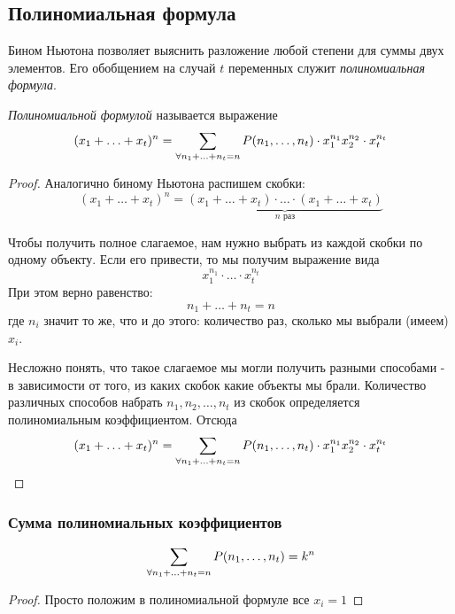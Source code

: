 \subsection{Полиномиальная формула}

\begin{definition}
	Бином Ньютона позволяет выяснить разложение любой степени для суммы двух элементов. Его обобщением на случай $t$ переменных служит \textit{полиномиальная формула}.
\end{definition}

\begin{theorem}
	\textit{Полиномиальной формулой} называется выражение
	\[
		(x_1 + \ldots + x_t)^n = \sum\limits_{\forall n_1 + \ldots + n_t = n} P(n_1, \ldots, n_t) \cdot x_1^{n_1} x_2^{n_2} \cdot x_t^{n_t}
	\]
\end{theorem}

\begin{proof}
	Аналогично биному Ньютона распишем скобки:
	\[
		(x_1 + \ldots + x_t)^n = \underbrace{(x_1 + \ldots + x_t) \cdot \ldots \cdot (x_1 + \ldots + x_t)}_{n \text{ раз}}
	\]
	
	Чтобы получить полное слагаемое, нам нужно выбрать из каждой скобки по одному объекту. Если его привести, то мы получим выражение вида
	\[
		x_1^{n_1} \cdot \ldots \cdot x_t^{n_t}
	\]
	При этом верно равенство:
	\[
		n_1 + \ldots + n_t = n
	\]
	где $n_i$ значит то же, что и до этого: количество раз, сколько мы выбрали (имеем) $x_i$.
	
	Несложно понять, что такое слагаемое мы могли получить разными способами - в зависимости от того, из каких скобок какие объекты мы брали. Количество различных способов набрать $n_1, n_2, \ldots, n_t$ из скобок определяется полиномиальным коэффициентом. Отсюда 
	\[
		(x_1 + \ldots + x_t)^n = \sum\limits_{\forall n_1 + \ldots + n_t = n} P(n_1, \ldots, n_t) \cdot x_1^{n_1} x_2^{n_2} \cdot x_t^{n_t}
	\]
\end{proof}

\subsubsection*{Сумма полиномиальных коэффициентов}

\begin{proposition}
	\[
		\sum\limits_{\forall n_1 + \ldots + n_t = n} P(n_1, \ldots, n_t) = k^n
	\]
\end{proposition}

\begin{proof}
	Просто положим в полиномиальной формуле все $x_i = 1$
\end{proof}

